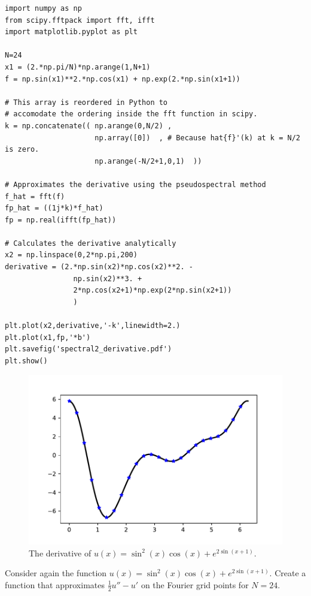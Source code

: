 \begin{lstlisting}
import numpy as np
from scipy.fftpack import fft, ifft
import matplotlib.pyplot as plt

N=24
x1 = (2.*np.pi/N)*np.arange(1,N+1)
f = np.sin(x1)**2.*np.cos(x1) + np.exp(2.*np.sin(x1+1))

# This array is reordered in Python to
# accomodate the ordering inside the fft function in scipy.
k = np.concatenate(( np.arange(0,N/2) ,
					 np.array([0])	, # Because hat{f}'(k) at k = N/2 is zero.
					 np.arange(-N/2+1,0,1)	))

# Approximates the derivative using the pseudospectral method
f_hat = fft(f)
fp_hat = ((1j*k)*f_hat)
fp = np.real(ifft(fp_hat))

# Calculates the derivative analytically
x2 = np.linspace(0,2*np.pi,200)
derivative = (2.*np.sin(x2)*np.cos(x2)**2. - 
				np.sin(x2)**3. + 
				2*np.cos(x2+1)*np.exp(2*np.sin(x2+1))
				)

plt.plot(x2,derivative,'-k',linewidth=2.)
plt.plot(x1,fp,'*b')
plt.savefig('spectral2_derivative.pdf')
plt.show()
\end{lstlisting}

\begin{figure}
\centering
\includegraphics[width=\textwidth]{spectral2_derivative.pdf}
\caption{The derivative of $u(x) = \sin^2 (x) \cos(x) +e^{2\sin(x+1)}$.}
\label{fig:spectral:spectral2_derivative}
\end{figure}

\begin{problem}
Consider again the function $u(x) = \sin^2 (x) \cos(x) +e^{2\sin(x+1)}$.
Create a function that approximates $\frac{1}{2}u''-u'$ on the Fourier grid points for $N=24$.	
\end{problem}


